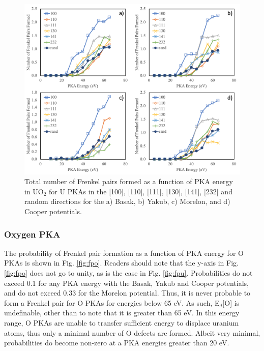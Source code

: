 \documentclass[review]{elsarticle}
\begin{document}
\begin{figure}[h]
 \centering
 \includegraphics[width=1.0\textwidth]{FP_UN.png}
 \caption{Total number of Frenkel pairs formed as a function of PKA energy in UO$_2$ for U PKAs in the [100], [110], [111], [130], [141], [232] and random directions for the a) Basak, b) Yakub, c) Morelon, and d) Cooper potentials. }
 \label{fig:fpun}
\end{figure}

\FloatBarrier

\subsubsection{Oxygen PKA}

The probability of Frenkel pair formation as a function of PKA energy for O PKAs is shown in Fig. \ref{fig:fpo}. Readers should note that the y-axis in Fig. \ref{fig:fpo} does not go to unity, as is the case in Fig. \ref{fig:fpu}. Probabilities do not exceed 0.1 for any PKA energy with the Basak, Yakub and Cooper potentials, and do not exceed 0.33 for the Morelon potential. Thus, it is never probable to form a Frenkel pair for O PKAs for energies below 65 eV. As such, E$_d$[O] is undefinable, other than to note that it is greater than 65 eV. In this energy range, O PKAs are unable to transfer sufficient energy to displace uranium atoms, thus only a minimal number of O defects are formed. Albeit very minimal, probabilities do become non-zero at a PKA energies greater than 20 eV.
\end{document}
